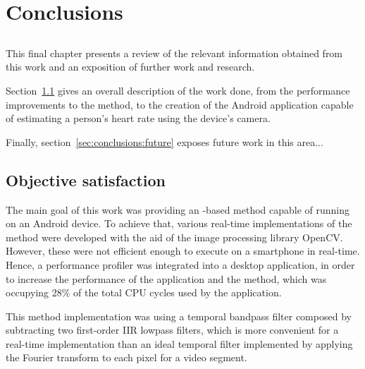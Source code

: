 \chapter{Conclusions} \label{chap:conclusions}

\section*{}



This final chapter presents a review of the relevant information obtained
from this work and an exposition of further work and research.

Section~\ref{sec:conclusions:objectives} gives an overall description of
the work done, from the performance improvements to the \evm{} method,
to the creation of the Android application capable of estimating a
person's heart rate using the device's camera.

Finally, section~\ref{sec:conclusions:future} exposes future work in this
area... %

\section{Objective satisfaction} \label{sec:conclusions:objectives}

The main goal of this work was providing an \evm{}-based method capable of
running on an Android device. To achieve that, various real-time
implementations of the \evm{} method were developed with the aid of the
image processing library OpenCV. However, these were
not efficient enough to execute on a smartphone in real-time. Hence,
a performance profiler was integrated into a desktop application, in order to
increase the performance of the application and the \evm{} method,
which was occupying 28\% of the total CPU cycles used by the application.

This \evm{} method implementation was using a temporal bandpass filter composed
by subtracting two first-order IIR lowpass filters, which is more convenient
for a real-time implementation than an ideal temporal filter implemented by
applying the Fourier transform to each pixel for a video segment.

